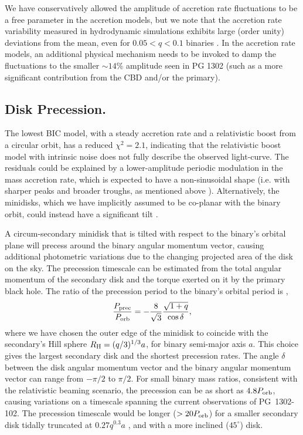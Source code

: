 We have conservatively allowed the amplitude of accretion rate
fluctuations to be a free parameter in the accretion models, but we
note that the accretion rate variability measured in hydrodynamic
simulations exhibits large (order unity) deviations from the mean,
even for $0.05<q<0.1$ binaries \cite{DHM:2013:MNRAS, Farris:2014,
  ShiKrolik:2015}.  In the accretion rate models, an additional
physical mechanism needs to be invoked to damp the fluctuations to the
smaller $\sim 14\%$ amplitude seen in PG 1302 (such as a more
significant contribution from the CBD and/or the primary).

\subsection{Disk Precession.}
The lowest BIC model, with a steady accretion rate and a relativistic
boost from a circular orbit, has a reduced $\chi^2=2.1$, indicating
that the relativistic boost model with intrinsic noise does not fully
describe the observed light-curve.  The residuals could be explained
by a lower-amplitude periodic modulation in the mass accretion rate,
which is expected to have a non-sinusoidal shape (i.e. with sharper
peaks and broader troughs, as mentioned
above \cite{Farris:2014}). Alternatively, the minidisks, which we have
implicitly assumed to be co-planar with the binary orbit, could
instead have a significant tilt \cite{NixonKing:Tear:2013}.

A circum-secondary minidisk that is tilted with respect to the
binary's orbital plane will precess around the binary angular momentum
vector, causing additional photometric variations due to the changing
projected area of the disk on the sky. The precession timescale can be
estimated from the total angular momentum of the secondary disk and
the torque exerted on it by the primary black hole.  The ratio of the precession
period to the binary's orbital period is \cite{DLai2014},
%
\begin{align}
\frac{P_{\rm prec}}{P_{\rm orb}}=  -\frac{8}{\sqrt{3}} \frac{\sqrt{1+ q }}{  \cos{\delta}},
\end{align}
%
where we have chosen the outer edge of the minidisk to coincide with
the secondary's Hill sphere $R_{\rm H} = (q/3)^{1/3}a$, for binary
semi-major axis $a$. This choice gives the largest secondary disk and
the shortest precession rates.  The angle $\delta$ between the disk
angular momentum vector and the binary angular momentum vector can
range from $-\pi/2$ to $\pi/2$. For small binary mass ratios,
consistent with the relativistic beaming scenario, the precession can
be as short as $4.8 P_{\rm orb}$, causing variations on a timescale
spanning the current observations of PG~1302-102. The precession
timescale would be longer ($>20 P_{\rm {orb}}$) for a smaller
secondary disk tidally truncated at $0.27q^{0.3}a$ 
\cite{Roedig+Krolik+Miller2014}, and with a more inclined ($45^{\circ}$) disk.



